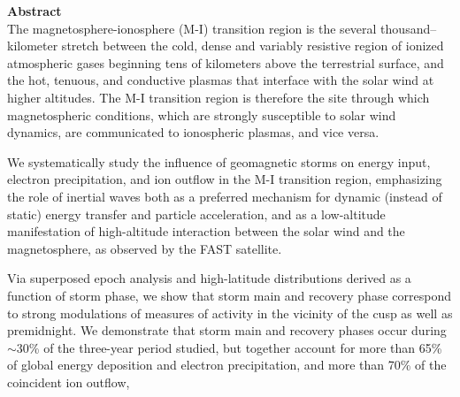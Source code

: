 
\vspace*{1in}
{\Huge \bf Abstract} \\

The magnetosphere-ionosphere (M-I) transition region is the several
thousand--kilometer stretch between the cold, dense and variably resistive
region of ionized atmospheric gases beginning tens of kilometers above the
terrestrial surface, and the hot, tenuous, and conductive plasmas that interface
with the solar wind at higher altitudes. The M-I transition region is therefore
the site through which magnetospheric conditions, which are strongly susceptible
to solar wind dynamics, are communicated to ionospheric plasmas, and vice versa.

We systematically study the influence of geomagnetic storms on energy input,
electron precipitation, and ion outflow in the M-I transition region,
emphasizing the role of inertial \Alf waves both as a preferred mechanism for
dynamic (instead of static) energy transfer and particle acceleration, and as a
low-altitude manifestation of high-altitude interaction between the solar wind
and the magnetosphere, as observed by the FAST satellite.

Via superposed epoch analysis and high-latitude distributions derived as a
function of storm phase, we show that storm main and recovery phase correspond
to strong modulations of measures of \Alfic activity in the vicinity of the cusp
as well as premidnight. We demonstrate that storm main and recovery phases occur
during $\sim$30\% of the three-year period studied, but together account for more
than 65\% of global \Alfic energy deposition and electron precipitation, and
more than 70\% of the coincident ion outflow,

